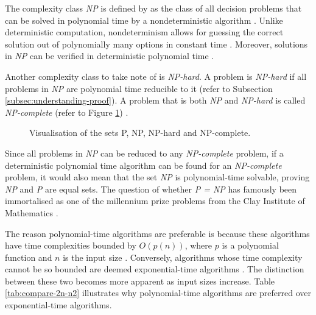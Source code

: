 \documentclass[a4paper, 12pt]{extreport}
\begin{document}
				The complexity class \textit{NP} is defined by \citeauthor{computers-and-intractability} as the class of all decision problems that can be solved in polynomial time by a nondeterministic algorithm \cite{computers-and-intractability}. Unlike deterministic computation, nondeterminism allows for guessing the correct solution out of polynomially many options in constant time \cite{npcompleteness}. Moreover, solutions in \textit{NP} can be verified in deterministic polynomial time \cite{sipser-intro-to-computation}.
				
				Another complexity class to take note of is \textit{NP-hard}. A problem is \textit{NP-hard} if all problems in \textit{NP} are polynomial time reducible to it (refer to Subsection  \ref{subsec:understanding-proof})\cite{sipser-intro-to-computation}. A problem that is both \textit{NP} and \textit{NP-hard} is called \textit{NP-complete} (refer to Figure \ref{fig:p,np,npcomplete}) \cite{npcompleteness}.
				
				\begin{figure}
					\centering
					\caption{\centering Visualisation of the sets P, NP, NP-hard and NP-complete.}
					\label{fig:p,np,npcomplete}
				\end{figure}
				
				Since all problems in \textit{NP} can be reduced to any \textit{NP-complete} problem, if a deterministic polynomial time algorithm can be found for an \textit{NP-complete} problem, it would also mean that the set \textit{NP} is polynomial-time solvable, proving \textit{NP} and \textit{P} are equal sets. The question of whether \textit{P = NP} has famously been immortalised as one of the millennium prize problems from the Clay Institute of Mathematics \cite{claymathMillenniumPrize}.
				
				
				The reason polynomial-time algorithms are preferable is because these algorithms have time complexities bounded by $O(p(n))$, where $p$ is a polynomial function and $n$ is the input size \cite{computers-and-intractability}. Conversely, algorithms whose time complexity cannot be so bounded are deemed exponential-time algorithms \cite{computers-and-intractability}. The distinction between these two becomes more apparent as input sizes increase. Table \ref{tab:compare-2n-n2} illustrates why polynomial-time algorithms are preferred over exponential-time algorithms.
				
\end{document}
